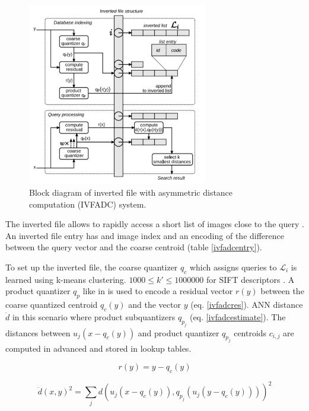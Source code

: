 \documentclass[english,12pt,a4paper,pdftex,elec,utf8, table]{aaltothesis}
\begin{document}
\begin{figure}[htb]
\begin{center}
\includegraphics[height=8cm]{figures/ivfadc}
\end{center}
\caption{Block diagram of inverted file with asymmetric distance computation (IVFADC) system. \cite{Jegou2008}}
\label{ivfadcfig}
\end{figure}

The inverted file allows to rapidly access a short list of images close to the query \cite{Jegou2008}. An inverted file entry has and image index and an encoding of the difference between the query vector and the coarse centroid (table \ref{ivfadcentry}).

To set up the inverted file, the coarse quantizer $q_c$ which assigns queries to $\mathcal{L}_i$ is learned using k-means clustering. $1000 \leq k' \leq 1000000$ for SIFT descriptors \cite{Jegou2008}. A product quantizer $q_p$ like in \cite{Sivic2003} is used to encode a residual vector $r(y)$ between the coarse quantized centroid $q_c(y)$ and the vector $y$ (eq. \ref{ivfadcres}). ANN distance $\ddot{d}$ in this scenario where product subquantizers $q_{p_j}$ (eq. \ref{ivfadcestimate}). The distances between $u_j(x-q_c(y))$
and product quantizer $q_{p_j}$ centroids $c_{i,j}$ are computed in advanced and stored in lookup tables. \cite{Jegou2008}

\begin{equation}
  \label{ivfadcres}
r(y) = y - q_c(y)
\end{equation}

\begin{equation}
  \label{ivfadcestimate}
  \ddot{d}(x,y)^2 = \sum_jd\left(u_j(x-q_c(y)), q_{p_j}(u_j(y-q_c(y)))\right)^2
\end{equation}
\end{document}
